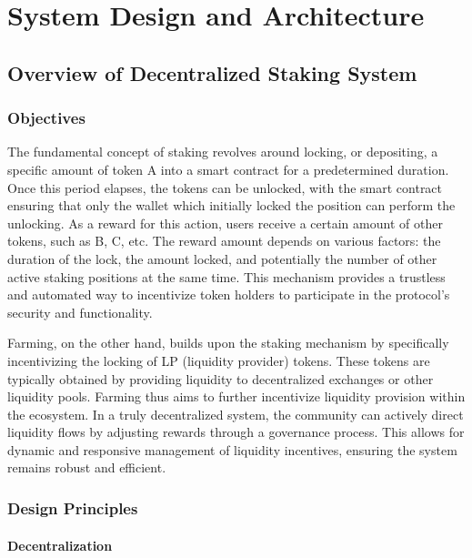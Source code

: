 \documentclass[12pt,parskip=full, tikz]{article}
\begin{document}
\section{System Design and Architecture}

\subsection{Overview of Decentralized Staking System}

\subsubsection{Objectives}

The fundamental concept of staking revolves around locking, or depositing, a specific amount of token A into a smart contract for a predetermined duration. Once this period elapses, the tokens can be unlocked, with the smart contract ensuring that only the wallet which initially locked the position can perform the unlocking. As a reward for this action, users receive a certain amount of other tokens, such as B, C, etc. The reward amount depends on various factors: the duration of the lock, the amount locked, and potentially the number of other active staking positions at the same time. This mechanism provides a trustless and automated way to incentivize token holders to participate in the protocol's security and functionality.

Farming, on the other hand, builds upon the staking mechanism by specifically incentivizing the locking of LP (liquidity provider) tokens. These tokens are typically obtained by providing liquidity to decentralized exchanges or other liquidity pools. Farming thus aims to further incentivize liquidity provision within the ecosystem. In a truly decentralized system, the community can actively direct liquidity flows by adjusting rewards through a governance process. This allows for dynamic and responsive management of liquidity incentives, ensuring the system remains robust and efficient.

\subsubsection{Design Principles}

\paragraph{Decentralization}
\end{document}
